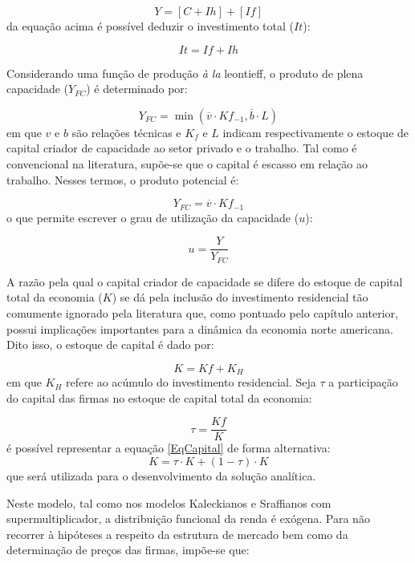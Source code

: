 \begin{equation}
    Y = [C + Ih] + [If]
\end{equation}
da equação acima é possível deduzir o investimento total ($It$):

\begin{equation}
    It = If + Ih
\end{equation}

Considerando uma função de produção \textit{à la} leontieff, o produto de plena capacidade ($Y_{FC}$) é determinado por:

$$
Y_{FC} = \min (\overline v\cdot Kf_{-1}, \overline b\cdot L)
$$
em que $v$ e $b$ são relações técnicas e $K_f$ e $L$ indicam respectivamente o estoque de capital criador de capacidade ao setor privado e  o trabalho. Tal como é convencional na literatura, supõe-se que o capital é escasso em relação ao trabalho. Nesses termos, o produto potencial é:

\begin{equation}
    Y_{FC} = \overline v\cdot Kf_{-1}
\end{equation}
o que permite escrever o grau de utilização da capacidade ($u$):

\begin{equation}
    u = \frac{Y}{Y_{FC}}
\end{equation}

A razão pela qual o capital criador de capacidade se difere do estoque de capital total da economia ($K$) se dá pela inclusão do investimento residencial tão comumente ignorado pela literatura que, como pontuado pelo capítulo anterior, possui implicações importantes para a dinâmica da economia norte americana. Dito isso, o estoque de capital é dado por:

\begin{equation}
\label{EqCapital}
    K = Kf + K_{H}
\end{equation}
em que $K_H$ refere ao acúmulo do investimento residencial. Seja $\tau$ a participação do capital das firmas no estoque de capital total da economia:

\begin{equation}
\tau = \frac{Kf}{K}    
\end{equation}
é possível representar a equação \ref{EqCapital} de forma alternativa:
$$
K = \tau\cdot K + (1-\tau)\cdot K
$$
que será utilizada para o desenvolvimento da solução analítica.

Neste modelo, tal como nos modelos Kaleckianos e Sraffianos com supermultiplicador, a distribuição funcional da renda é exógena. Para não recorrer à hipóteses a respeito da estrutura de mercado bem como da determinação de preços das firmas, impõe-se que:

